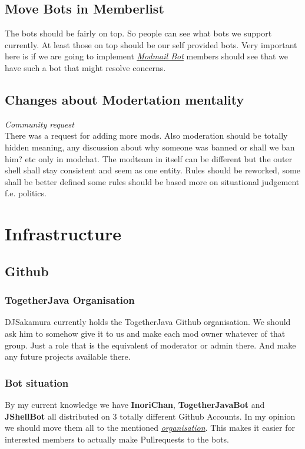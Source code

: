 \documentclass{article}
\newcommand{\refsection}[2]{\hyperref[#1]{\underline{\textit{#2}}}}
\begin{document}
    \subsection{Move Bots in Memberlist}
    The bots should be fairly on top. So people can see what bots we support currently. 
    At least those on top should be our self provided bots. 
    Very important here is if we are going to implement \refsection{sec:modmailbot}{Modmail Bot} members should see that we have such a bot that might resolve concerns.

    \subsection{Changes about Modertation mentality}
    \textit{Community request} \\ \newline 
    There was a request for adding more mods. Also moderation should be totally hidden meaning, 
    any discussion about why someone was banned or shall we ban him? etc only in modchat. 
    The modteam in itself can be different but the outer shell shall stay consistent and seem as one entity.
    Rules should be reworked, some shall be better defined some rules should be based more on situational judgement f.e. politics.

    \section{Infrastructure}

    \subsection{Github}

    \subsubsection{TogetherJava Organisation}
    \label{sec:githuborganisation}
    DJSakamura currently holds the TogetherJava Github organisation. 
    We should ask him to somehow give it to us and make each mod owner whatever of that group. 
    Just a role that is the equivalent of moderator or admin there. And make any future projects available there.

    \subsubsection{Bot situation}
    By my current knowledge we have \textbf{InoriChan}, \textbf{TogetherJavaBot} and \textbf{JShellBot} all distributed on 3 totally different Github Accounts.
    In my opinion we should move them all to the mentioned \hyperref[sec:githuborganisation]{\underline{\textit{organisation}}}. 
    This makes it easier for interested members to actually make Pullrequests to the bots.
\end{document}
